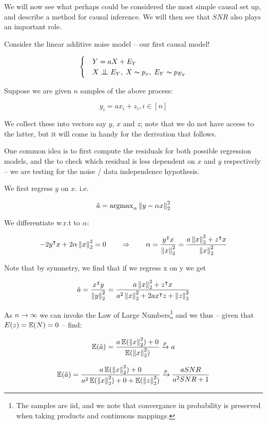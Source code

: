 We will now see what perhaps could be considered the most simple causal set up, and describe a method
for causal inference. We will then see that $SNR$ also plays an important role.

Consider the linear additive noise model -- our first causal model!

\[ \begin{cases} 
    & Y = aX + E_Y  \\
    & X \bigCI E_Y,\; X \thicksim p_x,\; E_Y \thicksim p_{E_Y}  
 \end{cases}
\]

Suppose we are given $n$ samples of the above process:

$$
    y_i = ax_i + z_i, i \in \left[n\right]
$$

We collect these into vectors say $y$, $x$ and $z$; note that we do not have
access to the latter, but it will come in handy for the derivation that follows.

One common idea is to first compute the residuals for both possible regression models,
and the to check which residual is less dependent on $x$ and $y$ respectively -- we are
testing for the noise / data independence hypothesis.

We first regress $y$ on $x$. i.e.

$$
    \hat{a} = \operatorname{argmax}_{\alpha} \left\lVert y - \alpha x\right\rVert_{2}^2
$$

We differentiate w.r.t to $\alpha$:

$$
    -2y^\intercal x + 2\alpha \left\lVert x\right\rVert_2^2 = 0 \qquad \Rightarrow \qquad 
    \alpha = \frac{y^\intercal x}{\left\lVert x\right\rVert_2^2} = 
    \frac{a\left\lVert x\right\rVert_2^2 + z^\intercal x}{\left\lVert x\right\rVert_2^2}
$$

Note that by symmetry, we find that if we regress x on y we get

$$
    \tilde{a} = \frac{x^\intercal y}{\left\lVert y\right\rVert_2^2} = 
    \frac{a\left\lVert x\right\rVert_2^2 + z^\intercal x}{a^2 \left\lVert x\right\rVert_2^2 + 2a x^\intercal z + \left\lVert z\right\rVert^2_2}
$$

As $n \rightarrow \infty$ we can invoke the Law of Large Numbers\footnote{The samples are iid, 
and we note that convergance in probability is preserved when taking products and 
continuous mappings.} and we thus -- given that $E(z) = \operatorname{\mathbb{E}}(N) = 0$ -- find:

$$
    \operatorname{\mathbb{E}}(\hat{a}) = \frac{a\operatorname{\mathbb{E}}(\left\lVert x\right\rVert_2^2) + 0}{\operatorname{\mathbb{E}}(\left\lVert x\right\rVert_2^2)} \xrightarrow{p} a 
$$

$$
    \operatorname{\mathbb{E}}(\tilde{a}) = \frac{a\operatorname{\mathbb{E}}(\left\lVert x\right\rVert_2^2) + 0}{
        a^2 \operatorname{\mathbb{E}}(\left\lVert x\right\rVert_2^2) + 0 + \operatorname{\mathbb{E}}(\left\lVert z\right\rVert^2_2)} \xrightarrow{p}
        \frac{a SNR}{a^2 SNR + 1}
$$

